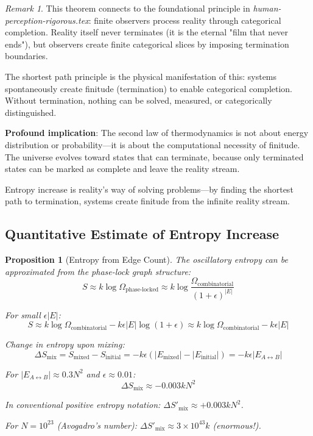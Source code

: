 \documentclass[12pt,a4paper]{article}
\newtheorem{proposition}[theorem]{Proposition}
\theoremstyle{remark}
\newtheorem{remark}[theorem]{Remark}
\begin{document}
\begin{remark}
This theorem connects to the foundational principle in \textit{human-perception-rigorous.tex}: finite observers process reality through categorical completion. Reality itself never terminates (it is the eternal "film that never ends"), but observers create finite categorical slices by imposing termination boundaries.

The shortest path principle is the physical manifestation of this: systems spontaneously create finitude (termination) to enable categorical completion. Without termination, nothing can be solved, measured, or categorically distinguished.

\textbf{Profound implication}: The second law of thermodynamics is not about energy distribution or probability—it is about the computational necessity of finitude. The universe evolves toward states that can terminate, because only terminated states can be marked as complete and leave the reality stream.

Entropy increase is reality's way of solving problems—by finding the shortest path to termination, systems create finitude from the infinite reality stream.
\end{remark}

\subsection{Quantitative Estimate of Entropy Increase}

\begin{proposition}[Entropy from Edge Count]
The oscillatory entropy can be approximated from the phase-lock graph structure:
\begin{equation}
S \approx k \log \Omega_{\text{phase-locked}} \approx k \log \frac{\Omega_{\text{combinatorial}}}{(1 + \epsilon)^{|E|}}
\end{equation}

For small $\epsilon |E|$:
\begin{equation}
S \approx k \log \Omega_{\text{combinatorial}} - k \epsilon |E| \log(1 + \epsilon) \approx k \log \Omega_{\text{combinatorial}} - k\epsilon |E|
\end{equation}

 Change in entropy upon mixing:
\begin{equation}
\Delta S_{\text{mix}} = S_{\text{mixed}} - S_{\text{initial}} = -k\epsilon(|E_{\text{mixed}}| - |E_{\text{initial}}|) = -k\epsilon |E_{A \leftrightarrow B}|
\end{equation}

For $|E_{A \leftrightarrow B}| \approx 0.3N^2$ and $\epsilon \approx 0.01$:
\begin{equation}
\Delta S_{\text{mix}} \approx -0.003 k N^2
\end{equation}

In conventional positive entropy notation: $\Delta S'_{\text{mix}} \approx +0.003 k N^2$.

For $N = 10^{23}$ (Avogadro's number): $\Delta S'_{\text{mix}} \approx 3 \times 10^{43} k$ (enormous!).
\end{proposition}
\end{document}
